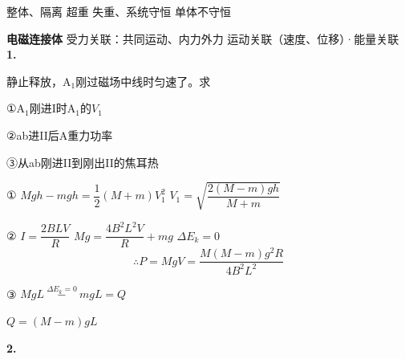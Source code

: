 整体、隔离 \quad 超重 失重、系统守恒 \quad 单体不守恒

\textbf{电磁连接体} \quad 受力关联：共同运动、内力外力 \quad 运动关联（速度、位移）·能量关联
\textbf{1.}

\begin{problem}
静止释放，A$_1$刚过磁场中线时匀速了。求

①A$_1$刚进I时A$_1$的$V_1$

②ab进II后A重力功率

③从ab刚进II到刚出II的焦耳热
\begin{solution}
① $Mgh-mgh=\dfrac12(M+m)V_1^{2}$ \qquad $V_1=\sqrt{\dfrac{2(M-m)gh}{M+m}}$

②  \quad $I=\dfrac{2BLV}{R}$ \qquad $Mg=\dfrac{4B^{2}L^{2}V}{R}+mg$ \qquad $\Delta E_k=0$ 
\[ \therefore P=MgV=\frac{M(M-m)g^{2}R}{4B^{2}L^{2}} \]

③ $MgL\ \overset{\Delta E_k=0}{-}\ mgL=Q$

$Q=(M-m)gL$
\end{solution}
\end{problem}
\textbf{2.}


